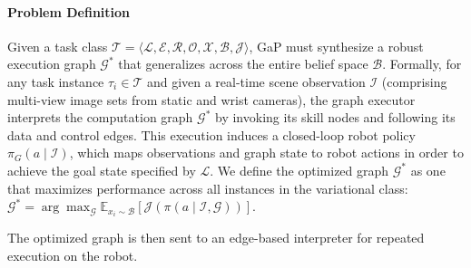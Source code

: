 




\paragraph{Problem Definition}

Given a task class $\mathcal{T} = \langle \mathcal{L}, \mathcal{E}, \mathcal{R}, \mathcal{O}, \mathcal{X}, \mathcal{B}, \mathcal{J} \rangle$, GaP must synthesize a robust execution graph $\mathcal{G}^*$ that generalizes across the entire belief space $\mathcal{B}$. Formally, for any task instance $\tau_i \in \mathcal{T}$ and given a real-time scene observation $\mathcal{I}$ (comprising multi-view image sets from static and wrist cameras), the graph executor interprets
the computation graph $\mathcal{G}^*$ by invoking its skill nodes and following its data and control edges.  This execution induces a closed-loop robot policy $\pi_G(a \mid \mathcal{I})$, which maps observations and graph state to robot actions in order to achieve the goal state specified by $\mathcal{L}$.  We define the optimized graph $\mathcal{G}^*$ as one that maximizes performance across all instances in the variational class:~$\mathcal{G}^* = \arg\max_{\mathcal{G}} \mathbb{E}_{x_i \sim \mathcal{B}} \left[ \mathcal{J}(\pi(a\mid\mathcal{I}, \mathcal{G})) \right]$. 

The optimized graph is then sent to an edge-based interpreter for repeated execution on the robot.



